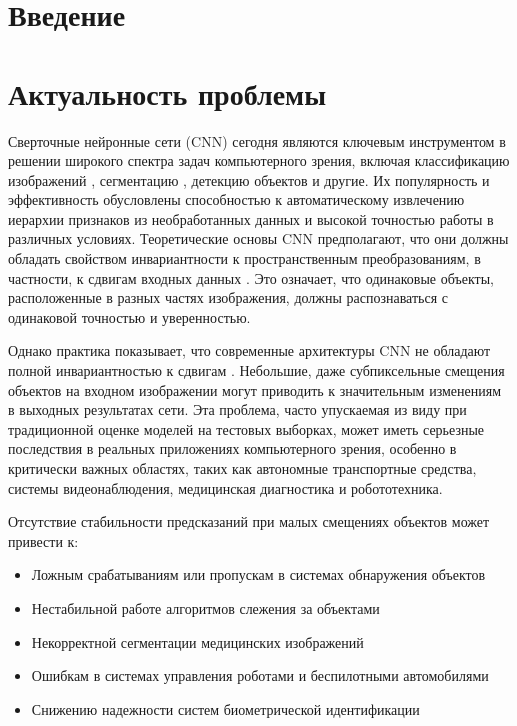 \section*{Введение}
\label{sec:Chapter0} 

\section*{Актуальность проблемы}
\label{intro:relevance}

Сверточные нейронные сети (CNN) сегодня являются ключевым инструментом в решении широкого спектра задач компьютерного зрения, включая классификацию изображений \cite{krizhevsky2012imagenet, simonyan2014very}, сегментацию \cite{long2015fully}, детекцию объектов \cite{redmon2016you, ren2015faster} и другие. Их популярность и эффективность обусловлены способностью к автоматическому извлечению иерархии признаков из необработанных данных и высокой точностью работы в различных условиях. Теоретические основы CNN предполагают, что они должны обладать свойством инвариантности к пространственным преобразованиям, в частности, к сдвигам входных данных \cite{lecun1998gradient}. Это означает, что одинаковые объекты, расположенные в разных частях изображения, должны распознаваться с одинаковой точностью и уверенностью.

Однако практика показывает, что современные архитектуры CNN не обладают полной инвариантностью к сдвигам \cite{zhang2019making, azulay2019deep}. Небольшие, даже субпиксельные смещения объектов на входном изображении могут приводить к значительным изменениям в выходных результатах сети. Эта проблема, часто упускаемая из виду при традиционной оценке моделей на тестовых выборках, может иметь серьезные последствия в реальных приложениях компьютерного зрения, особенно в критически важных областях, таких как автономные транспортные средства, системы видеонаблюдения, медицинская диагностика и робототехника.

Отсутствие стабильности предсказаний при малых смещениях объектов может привести к:
\begin{itemize}
    \item Ложным срабатываниям или пропускам в системах обнаружения объектов
    \item Нестабильной работе алгоритмов слежения за объектами
    \item Некорректной сегментации медицинских изображений
    \item Ошибкам в системах управления роботами и беспилотными автомобилями
    \item Снижению надежности систем биометрической идентификации
\end{itemize}

